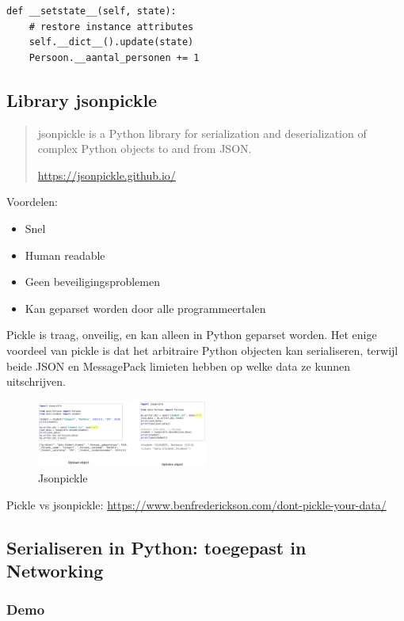 \documentclass{article}
\begin{document}
\begin{verbatim}
def __setstate__(self, state):
    # restore instance attributes
    self.__dict__().update(state)
    Persoon.__aantal_personen += 1
\end{verbatim}

\subsection{Library jsonpickle}

\begin{quotation}
    jsonpickle is a Python library for serialization and deserialization of complex
Python objects to and from JSON.

\url{https://jsonpickle.github.io/}
\end{quotation}

Voordelen:

\begin{itemize}
    \item Snel
    \item Human readable
    \item Geen beveiligingsproblemen
    \item Kan geparset worden door alle programmeertalen
\end{itemize}

Pickle is traag, onveilig, en kan alleen in Python geparset worden. 
Het enige voordeel van pickle is dat het arbitraire Python objecten kan serialiseren,
terwijl beide JSON en MessagePack limieten hebben op welke data ze kunnen uitschrijven.

\begin{figure}[H]
    \centering
    \includegraphics[width=0.5\textwidth]{jsonpickle.png}
    \caption{Jsonpickle}
\end{figure}

Pickle vs jsonpickle: \url{https://www.benfrederickson.com/dont-pickle-your-data/}

\subsection{Serialiseren in Python: toegepast in Networking}

\subsubsection{Demo}
\end{document}
